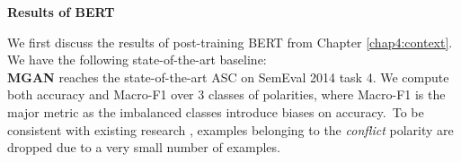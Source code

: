 


\textbf{Results of BERT}

We first discuss the results of post-training BERT from Chapter \ref{chap4:context}. We have the following state-of-the-art baseline:\\
\textbf{MGAN} \cite{li2018exploiting} reaches the state-of-the-art ASC on SemEval 2014 task 4.
We compute both accuracy and Macro-F1 over 3 classes of polarities, where Macro-F1 is the major metric as the imbalanced classes introduce biases on accuracy.~To be consistent with existing research \cite{tang2016aspect}, examples belonging to the \textit{conflict} polarity are dropped due to a very small number of examples.

\begin{table}
    \centering
    \caption{ASC in Accuracy and Macro-F1(MF1).}
\label{chap6:tbl:result_asc}
\vspace{-5mm}
\end{table}

